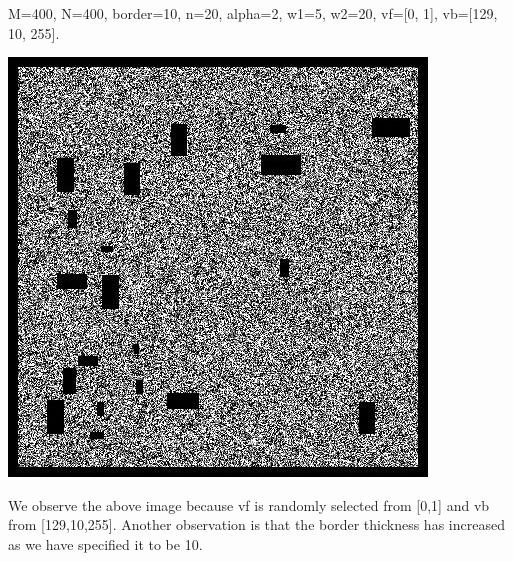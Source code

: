 \documentclass[12pt]{article}
\begin{document}
M=400, N=400, border=10, n=20, alpha=2, w1=5, w2=20, vf=[0, 1], vb=[129, 10, 255].\\
\begin{center}
\includegraphics[scale=0.5]{rectangle.jpg}
\end{center}
We observe the above image because vf is randomly selected from [0,1] and vb from [129,10,255]. Another observation is that the border thickness has increased as we have specified it to be 10.
\end{document}
